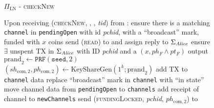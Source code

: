   \begin{figure}[H]
    \begin{protocolbox}{$\Pi_{\mathrm{LN}}$ - \textsc{checkNew}}
      \begin{algorithmic}[1]
        \State {}
        \State Upon receiving (\textsc{checkNew}, \alice, \bob, \textit{tid})
        from \environment: 
        \Indent
          \State ensure there is a matching \texttt{channel} in
          \texttt{pendingOpen} with id \textit{pchid}, with a ``broadcast''
          mark, funded with $x$ coins
          \label{alg:protocol:open:checkNew:valid}
          \State send (\textsc{read}) to \ledger{} and assign reply to
          $\Sigma_{\mathit{Alice}}$
          \State ensure $\exists$ unspent TX in $\Sigma_{\mathit{Alice}}$ with ID
          \textit{pchid} and a $\left(x, ph_F \wedge pt_F\right)$ output
          \State $\mathrm{prand}_2 \gets \texttt{PRF}\left(\mathtt{seed},
          2\right)$
          \label{alg:protocol:open:checkNew:prand}
          \State $\left(sh_{\mathrm{com}, 2}, ph_{\mathrm{com}, 2}\right) \gets
          \mathrm{KeyShareGen}\left(1^k; \mathrm{prand}_2\right)$
          \State add TX to \texttt{channel} data \State replace ``broadcast''
          mark in \texttt{channel} with ``in state''
            \State move channel data from \texttt{pendingOpen} to
            \texttt{channels}
            \State add receipt of channel to \texttt{newChannels}
          \EndIf
          \State send (\textsc{fundingLocked}, \textit{pchid},
          $ph_{\mathrm{com}, 2}$) to \bob{}
          \label{alg:protocol:open:checkNew:send}
        \EndIndent
      \end{algorithmic}
    \end{protocolbox}
    \caption{}
    \label{alg:protocol:open:checkNew}
  \end{figure}

